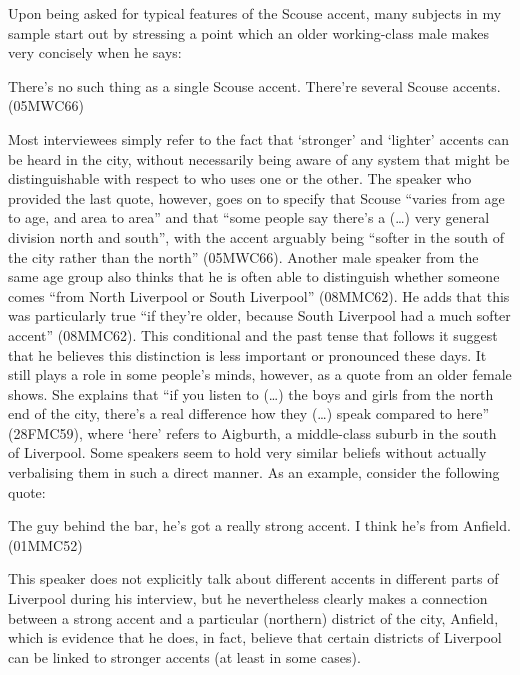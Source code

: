 Upon being asked for typical features of the Scouse accent, many subjects in my sample start out by stressing a point which an older working-class male makes very concisely when he says:
\begin{example}
	There's no such thing as a single Scouse accent. There're several Scouse accents. (05MWC66)
\end{example}
Most interviewees simply refer to the fact that `stronger' and `lighter' accents can be heard in the city, without necessarily being aware of any system that might be distinguishable with respect to who uses one or the other.
The speaker who provided the last quote, however, goes on to specify that Scouse ``varies from age to age, and area to area'' and that ``some people say there's a (\ldots) very general division north and south'', with the accent arguably being ``softer in the south of the city rather than the north'' (05MWC66).
Another male speaker from the same age group also thinks that he is often able to distinguish whether someone comes ``from North Liverpool or South Liverpool'' (08MMC62).
He adds that this was particularly true ``if they're older, because South Liverpool had a much softer accent'' (08MMC62).
This conditional and the past tense that follows it suggest that he believes this distinction is less important or pronounced these days.
It still plays a role in some people's minds, however, as a quote from an older female shows.
She explains that ``if you listen to (\ldots) the boys and girls from the north end of the city, there's a real difference how they (\ldots) speak compared to here'' (28FMC59), where `here' refers to Aigburth, a middle-class suburb in the south of Liverpool.
Some speakers seem to hold very similar beliefs without actually verbalising them in such a direct manner.
As an example, consider the following quote:
\begin{example}
	The guy behind the bar, he's got a really strong accent. I think he's from Anfield. (01MMC52)
\end{example}
This speaker does not explicitly talk about different accents in different parts of Liverpool during his interview, but he nevertheless clearly makes a connection between a strong accent and a particular (northern) district of the city, Anfield, which is evidence that he does, in fact, believe that certain districts of Liverpool can be linked to stronger accents (at least in some cases).

